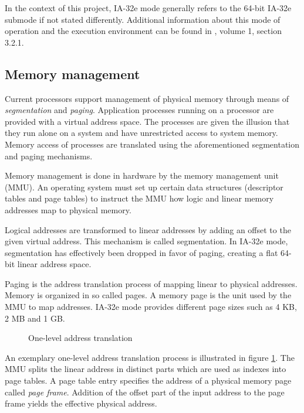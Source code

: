 In the context of this project, IA-32e mode generally refers to the 64-bit
IA-32e submode if not stated differently. Additional information about this mode
of operation and the execution environment can be found in \cite{IntelSDM},
volume 1, section 3.2.1.

\subsection{Memory management}
Current processors support management of physical memory through means of
\emph{segmentation} and \emph{paging}.
Application processes running on a processor are provided with a virtual
address space. The processes are given the illusion that they run alone on a
system and have unrestricted access to system memory. Memory access of
processes are translated using the aforementioned segmentation and paging
mechanisms.

Memory management is done in hardware by the memory management unit
(MMU).  An operating system must set up certain data structures
(descriptor tables and page tables) to instruct the MMU how logic and linear
memory addresses map to physical memory.

Logical addresses are transformed to linear addresses by adding an offset to
the given virtual address. This mechanism is called segmentation. In IA-32e
mode, segmentation has effectively been dropped in favor of paging, creating a
flat 64-bit linear address space.

Paging is the address translation process of mapping linear to physical
addresses. Memory is organized in so called pages. A memory page is the unit
used by the MMU to map addresses. IA-32e mode provides different page sizes
such as 4 KB, 2 MB and 1 GB.

\begin{figure}[h]
	\centering
	
	\caption{One-level address translation}
	\label{fig:address-translation}
\end{figure}

An exemplary one-level address translation process is illustrated in figure
\ref{fig:address-translation}. The MMU splits the linear address in distinct
parts which are used as indexes into page tables. A page table entry specifies
the address of a physical memory page called \emph{page frame}.  Addition of the
offset part of the input address to the page frame yields the effective physical
address.

